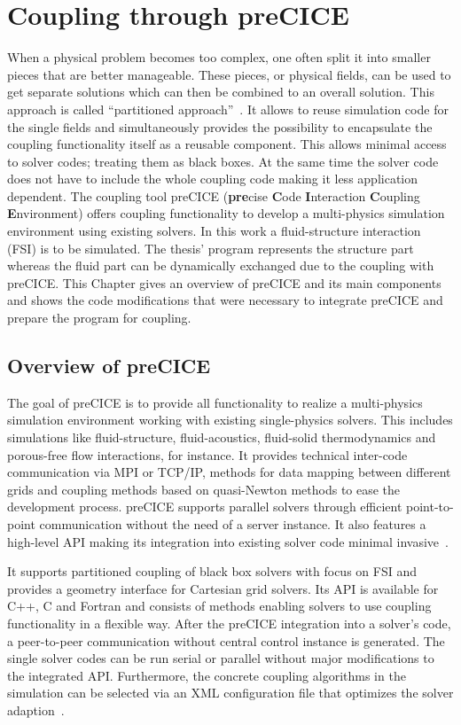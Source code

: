 \section{Coupling through preCICE}\label{sec:Coupl}
When a physical problem becomes too complex, one often split it into smaller pieces that are better manageable. These pieces, or physical fields, can be used to get separate solutions which can then be combined to an overall solution. This approach is called ``partitioned approach''~\cite{gatzhammer2015efficient}. It allows to reuse simulation code for the single fields and simultaneously provides the possibility to encapsulate the coupling functionality itself as a reusable component. This allows minimal access to solver codes; treating them as black boxes. At the same time the solver code does not have to include the whole coupling code making it less application dependent. The coupling tool preCICE (\textbf{pre}cise \textbf{C}ode \textbf{I}nteraction \textbf{C}oupling \textbf{E}nvironment) offers coupling functionality to develop a multi-physics simulation environment using existing solvers. In this work a fluid-structure interaction (FSI) is to be simulated. The thesis' program represents the structure part whereas the fluid part can be dynamically exchanged due to the coupling with preCICE. This Chapter gives an overview of preCICE and its main components and shows the code modifications that were necessary to integrate preCICE and prepare the program for coupling.

 \subsection{Overview of preCICE}\label{sec:Coupl-OverviewPreCICE}
  The goal of preCICE is to provide all functionality to realize a multi-physics simulation environment working with existing single-physics solvers. This includes simulations like fluid-structure, fluid-acoustics, fluid-solid thermodynamics and porous-free flow interactions, for instance. It provides technical inter-code communication via MPI or TCP/IP, methods for data mapping between different grids and coupling methods based on quasi-Newton methods to ease the development process. preCICE supports parallel solvers through efficient point-to-point communication without the need of a server instance. It also features a high-level API making its integration into existing solver code minimal invasive~\cite{bungartz2015fully}.
  
  It supports partitioned coupling of black box solvers with focus on FSI and provides a geometry interface for Cartesian grid solvers. Its API is available for C++, C and Fortran and consists of methods enabling solvers to use coupling functionality in a flexible way. After the preCICE integration into a solver's code, a peer-to-peer communication without central control instance is generated. The single solver codes can be run serial or parallel without major modifications to the integrated API. Furthermore, the concrete coupling algorithms in the simulation can be selected via an XML configuration file that optimizes the solver adaption~\cite{gatzhammer2015efficient}.
  
